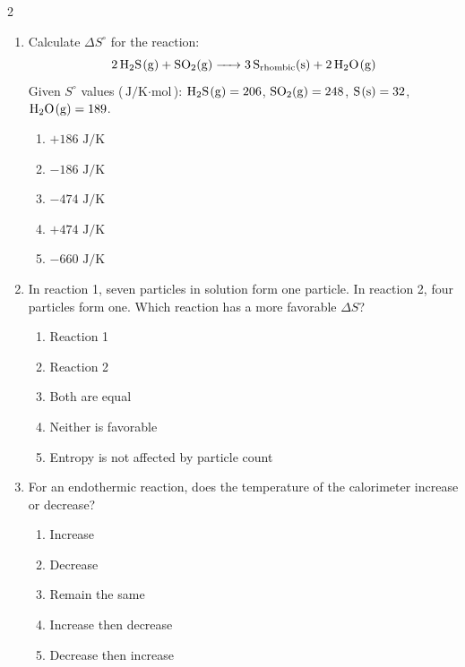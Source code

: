 \documentclass[12pt,letterpaper]{article}
\begin{document}
\begin{multicols*}{2}
\begin{enumerate}
        \item Calculate $\Delta S^\circ$ for the reaction:
            \begin{equation*}
                \ce{2H2S(g) + SO2(g) -> 3S_{rhombic}(s) + 2H2O(g)}
            \end{equation*}
            Given $S^\circ$ values ($\text{J/K}\cdot\text{mol}$): $\ce{H2S(g)} = 206$, $\ce{SO2(g)} = 248$, $\ce{S(s)} = 32$, $\ce{H2O(g)} = 189$. %
            \begin{enumerate}
                \item $+186\text{ J/K}$
                \item $-186\text{ J/K}$
                \item $-474\text{ J/K}$
                \item $+474\text{ J/K}$
                \item $-660\text{ J/K}$
            \end{enumerate}

        \item In reaction 1, seven particles in solution form one particle. In reaction 2, four particles form one. Which reaction has a more favorable $\Delta S$? %
            \begin{enumerate}
                \item Reaction 1
                \item Reaction 2
                \item Both are equal
                \item Neither is favorable
                \item Entropy is not affected by particle count
            \end{enumerate}

        \item For an endothermic reaction, does the temperature of the calorimeter increase or decrease? %
            \begin{enumerate}
                \item Increase
                \item Decrease
                \item Remain the same
                \item Increase then decrease
                \item Decrease then increase
            \end{enumerate}


\end{enumerate}
\end{multicols*}
\end{document}
